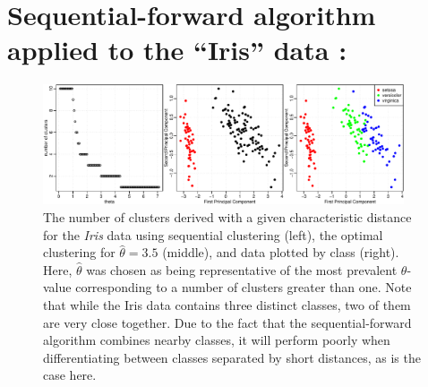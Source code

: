 \newpage

\section{Sequential-forward algorithm applied to the ``Iris'' data :}

\begin{figure}[H]
  \centering
    \includegraphics[width=0.95\textwidth]{images/iris_clusters.pdf}
  \caption{The number of clusters derived with a given characteristic distance for the \emph{Iris} data using sequential clustering (left), the optimal clustering for $\hat{\theta}=3.5$ (middle), and data plotted by class (right).  Here, $\hat{\theta}$ was chosen as being representative of the most prevalent $\theta$-value corresponding to a number of clusters greater than one.  Note that while the Iris data contains three distinct classes, two of them are very close together.   Due to the fact that the sequential-forward algorithm combines nearby classes, it will perform poorly when differentiating between classes separated by short distances, as is the case here.}
\end{figure}

